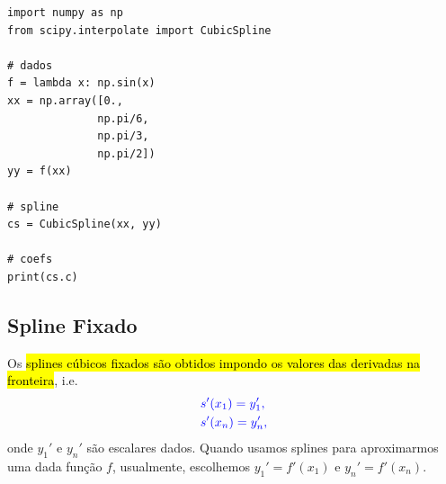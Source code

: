 \begin{ex}
\begin{lstlisting}[caption=splineNotAKnot.py]
import numpy as np
from scipy.interpolate import CubicSpline

# dados
f = lambda x: np.sin(x)
xx = np.array([0.,
              np.pi/6,
              np.pi/3,
              np.pi/2])
yy = f(xx)

# spline
cs = CubicSpline(xx, yy)

# coefs
print(cs.c)
\end{lstlisting}

\end{ex}

\subsection{Spline Fixado}

Os \hl{splines cúbicos fixados são obtidos impondo os valores das derivadas na fronteira}, i.e.
\begin{subequations}\hleq
  \begin{align}
    &s'(x_1)=y_1',\\
    &s'(x_n)=y_n',
  \end{align}
\end{subequations}
onde $y_1'$ e $y_n'$ são escalares dados. Quando usamos splines para aproximarmos uma dada função $f$, usualmente, escolhemos $y_1'=f'(x_1)$ e $y_n'=f'(x_n)$.

